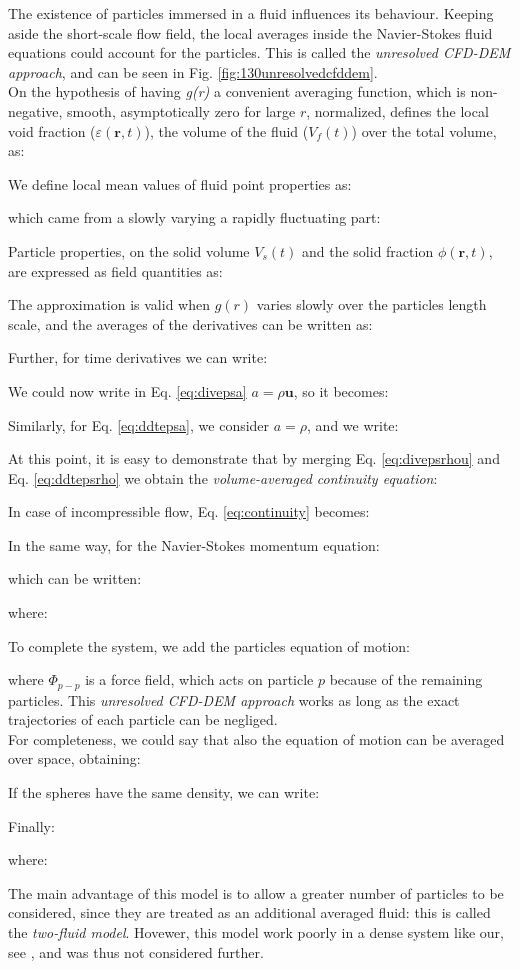 The existence of particles immersed in a fluid influences its behaviour. 
Keeping aside the short-scale flow field, the local averages inside the
Navier-Stokes fluid equations could account for the particles.
This is called the \textit{unresolved \acs{CFD}-\acs{DEM} approach}, and can be
seen in Fig. \ref{fig:130unresolvedcfddem}.\\

On the hypothesis of having \textit{g(r)} a convenient averaging
function, which is non-negative, smooth, asymptotically zero for large $r$, normalized, \citet{Refworks:201}
defines the local void fraction ($\varepsilon(\mathbf{r},t)$), the volume of the
fluid ($V_f(t)$) over the total volume, as:

We define local mean values of fluid point properties as:

which came from a slowly varying a rapidly fluctuating part:

Particle properties, on the solid volume $V_s(t)$ and the solid fraction
$\phi(\mathbf{r},t)$, are expressed as field quantities as:

The approximation is valid when $g(r)$ varies slowly over the particles length
scale, and the averages of the derivatives can be written as:

Further, for time derivatives we can write:

We could now write in Eq. \ref{eq:divepsa} $a = \rho \mathbf{u}$, so it becomes:

Similarly, for Eq. \ref{eq:ddtepsa}, we consider $a = \rho$, and we write:

At this point, it is easy to demonstrate that by merging Eq. \ref{eq:divepsrhou}
and Eq. \ref{eq:ddtepsrho} we obtain the \textit{volume-averaged continuity
equation}:

In case of incompressible flow, Eq. \ref{eq:continuity} becomes:

In the same way, for the Navier-Stokes momentum equation:

which can be written:

where:

To complete the system, we add the particles equation of motion:

where $\Phi_{p-p}$ is a force field, which acts on particle $p$ because of the
remaining particles.
This \textit{unresolved \acs{CFD}-\acs{DEM} approach} works as long as the exact
trajectories of each particle can be negliged.\\
For completeness, we could say that also the equation of motion can be averaged
over space, obtaining:

If the spheres have the same density, we can write:

Finally:

where:

The main advantage of this model is to allow a greater number of particles to be
considered, since they are treated as an additional averaged fluid: this is
called the \textit{two-fluid model}.
Hovewer, this model work poorly in a dense system like our, see
\citet{Refworks:202}, and was thus not considered further.
